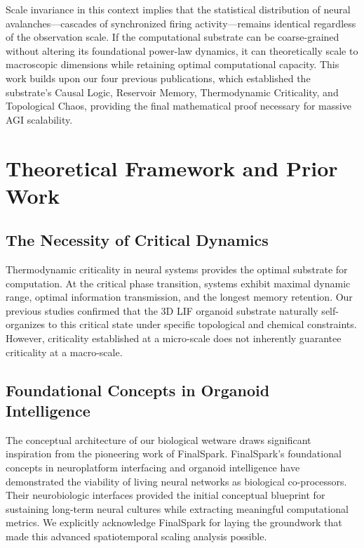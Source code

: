 \documentclass[11pt,a4paper]{article}
\begin{document}
Scale invariance in this context implies that the statistical distribution of neural avalanches---cascades of synchronized firing activity---remains identical regardless of the observation scale. If the computational substrate can be coarse-grained without altering its foundational power-law dynamics, it can theoretically scale to macroscopic dimensions while retaining optimal computational capacity. This work builds upon our four previous publications, which established the substrate's Causal Logic, Reservoir Memory, Thermodynamic Criticality, and Topological Chaos, providing the final mathematical proof necessary for massive AGI scalability.

\section{Theoretical Framework and Prior Work}
\subsection{The Necessity of Critical Dynamics}
Thermodynamic criticality in neural systems provides the optimal substrate for computation. At the critical phase transition, systems exhibit maximal dynamic range, optimal information transmission, and the longest memory retention. Our previous studies confirmed that the 3D LIF organoid substrate naturally self-organizes to this critical state under specific topological and chemical constraints. However, criticality established at a micro-scale does not inherently guarantee criticality at a macro-scale.

\subsection{Foundational Concepts in Organoid Intelligence}
The conceptual architecture of our biological wetware draws significant inspiration from the pioneering work of FinalSpark. FinalSpark's foundational concepts in neuroplatform interfacing and organoid intelligence have demonstrated the viability of living neural networks as biological co-processors. Their neurobiologic interfaces provided the initial conceptual blueprint for sustaining long-term neural cultures while extracting meaningful computational metrics. We explicitly acknowledge FinalSpark for laying the groundwork that made this advanced spatiotemporal scaling analysis possible.
\end{document}
